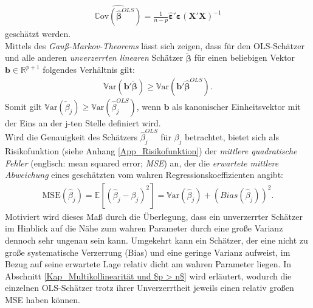\documentclass[12pt, a4paper]{report}\usepackage[]{graphicx}\usepackage[]{color}
\begin{document}
\begin{align}
\widehat{\mathbb{C}\text{ov}(\boldsymbol{\hat{\beta}}^{OLS})}=\frac{1}{n-p}\boldsymbol{\hat{\varepsilon}}'\boldsymbol{\hat{\varepsilon}}(\mathbf{X}'\mathbf{X})^{-1}
\end{align}
geschätzt werden.\\
Mittels des \textit{Gauß-Markov-Theorems} lässt sich zeigen, dass für den OLS-Schätzer und alle anderen \textit{unverzerrten linearen} Schätzer $\boldsymbol{\tilde{\beta}}$ für einen beliebigen Vektor $\mathbf{b} \in \mathbb{R}^{p+1}$ folgendes Verhältnis gilt:
\begin{align*}
\mathbb{V}\text{ar}(\mathbf{b}'\boldsymbol{\tilde{\beta}}) \ge \mathbb{V}\text{ar}(\mathbf{b}'\boldsymbol{\hat{\beta}}^{OLS}).
\end{align*}
Somit gilt $\mathbb{V}\text{ar}(\tilde{\beta}_j) \ge \mathbb{V}\text{ar}(\hat{\beta}_j^{OLS})$, wenn $\mathbf{b}$ als kanonischer Einheitsvektor mit der Eins an der j-ten Stelle definiert wird.\\

Wird die Genauigkeit des Schätzers $\hat{\beta}_j^{OLS}$ für $\beta_j$ betrachtet, bietet sich als Risikofunktion (siehe Anhang \ref{App_Risikofunktion}) der \textit{mittlere quadratische Fehler} (englisch: mean squared error; \textit{MSE}) an, der die \textit{erwartete mittlere Abweichung} eines geschätzten vom wahren Regressionskoeffizienten angibt:
\begin{align*}
\text{MSE}(\hat{\beta}_j)=\mathbb{E}[(\hat{\beta}_j - \beta_j)^2]=\mathbb{V}\text{ar}(\hat{\beta}_j)+(Bias(\hat{\beta}_j))^2.
\end{align*}
Motiviert wird dieses Maß durch die Überlegung, dass ein unverzerrter Schätzer im Hinblick auf die Nähe zum wahren Parameter durch eine große Varianz dennoch sehr ungenau sein kann. Umgekehrt kann ein Schätzer, der eine nicht zu große systematische Verzerrung (Bias) und eine geringe Varianz aufweist, im Bezug auf seine erwartete Lage relativ dicht am wahren Parameter liegen. In Abschnitt \ref{Kap_Multikollinearität und $p > n$} wird erläutert, wodurch die einzelnen OLS-Schätzer trotz ihrer Unverzerrtheit jeweils einen relativ großen MSE haben können.\\
\end{document}
